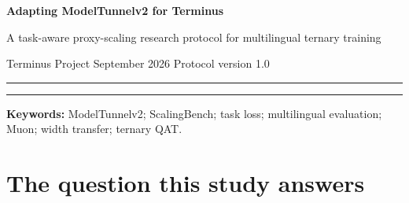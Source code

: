 \documentclass[10pt,a4paper]{article}
\begin{document}
\begin{center}
{\sffamily\bfseries\fontsize{19}{22}\selectfont Adapting ModelTunnelv2 for Terminus\par}
\vspace{2mm}
{\sffamily\large A task-aware proxy-scaling research protocol for multilingual ternary training\par}
\vspace{2mm}
{\sffamily Terminus Project \quad\textbar{} September 2026 \quad\textbar\quad Protocol version 1.0\par}
\end{center}
\vspace{2mm}\hrule\vspace{3mm}

\begin{abstract}
MiniCPM4's ModelTunnelv2 searches pretraining strategies with small proxy models, replaces generic pretraining loss with downstream-task conditional loss as a selection signal, and tests whether hyperparameters transfer across model size under maximal-update parameterization. This paper specifies how to reproduce that \emph{method} for the maintained Terminus model, whose optimizer, tokenizer, multilingual objective and ternary arithmetic differ from MiniCPM4. Public ScalingBench supplies five English task families, but the complete ModelTunnelv2 trainer and its exact proxy training mixture are not publicly released in the inspected sources. We therefore define a local tunnel: representative Terminus proxy data, explicit input/output scoring, an Indic task extension, empirical calibration between proxy loss and target-task performance, and a controlled Muon width-transfer test. Only after these gates pass may the tunnel rank learning rates, effective batches, data mixtures, quantizers, and dense-to-ternary schedules. A completed 800B-token FP8 model followed by 200B ternary QAT is included as one BitCPM4-inspired test case, not as an assumed optimum. This prospective protocol reports no new training or quality result.
\end{abstract}
\vspace{2mm}\hrule\vspace{3mm}
\noindent\textbf{Keywords:} ModelTunnelv2; ScalingBench; task loss; multilingual evaluation; Muon; width transfer; ternary QAT.

\section{The question this study answers}
\label{sec:question}
\end{document}
